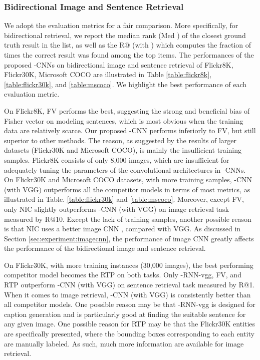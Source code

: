 \documentclass[10pt,twocolumn,letterpaper]{article}
\begin{document}
\label{sec_results}
\subsubsection {Bidirectional Image and Sentence Retrieval}

We adopt the evaluation metrics \cite{karpathy_2014} for a fair comparison. More specifically, for bidirectional retrieval, we report the median rank (Med  ) of the closest ground truth result in the list, as well as the R@ (with ) which computes the fraction of times the correct result was found among the top  items. The performances of the proposed -CNNs on bidirectional image and sentence retrieval of  Flickr8K, Flickr30K, Microsoft COCO are illustrated in Table \ref{table:flickr8k}, \ref{table:flickr30k}, and \ref{table:mscoco}. We highlight the best performance of each evaluation metric.






On Flickr8K, FV performs the best, suggesting the strong and beneficial bias of Fisher vector on modeling sentences, which is most obvious when the training data are relatively scarce. Our proposed -CNN performs inferiorly to FV, but still superior to other methods. The reason, as suggested by the results of larger datasets (Flickr30K and Microsoft COCO), is mainly the insufficient training samples. Flickr8K consists of only 8,000 images, which are insufficient for adequately tuning the parameters of the convolutional architectures in -CNNs. On Flickr30K and Microsoft COCO datasets, with more training samples, -CNN (with VGG) outperforms all the competitor models in terms of most metrics, as illustrated in Table. \ref{table:flickr30k} and \ref{table:mscoco}. Moreover, except FV, only NIC slightly outperforms -CNN (with VGG) on image retrieval task measured by R@10. Except the lack of training samples, another possible reason is that NIC uses a better image CNN \cite{szegedy_arxiv2014}, compared with VGG. As discussed in Section \ref{sec:experiment:imagecnn}, the performance of image CNN greatly affects the performance of the bidirectional image and sentence retrieval.

On Flickr30K, with more training instances (30,000 images), the best performing competitor model becomes the RTP on both tasks. Only -RNN-vgg, FV, and RTP outperform -CNN (with VGG) on sentence retrieval task measured by R@1. When it comes to image retrieval, -CNN (with VGG) is consistently better than all competitor models. One possible reason may be that -RNN-vgg is designed for caption generation and is particularly good at finding the suitable sentence for any given image. One possible reason for RTP may be that the Flickr30K entities are specifically presented, where the bounding boxes corresponding to each entity are manually labeled. As such, much more information are available for image retrieval.
\end{document}
